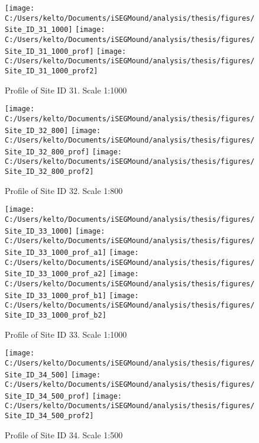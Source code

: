 \documentclass[
  12pt,
]{article}
\begin{document}
\begin{figure}
\texttt{[image: C:/Users/kelto/Documents/iSEGMound/analysis/thesis/figures/Site\_ID\_31\_1000]} \texttt{[image: C:/Users/kelto/Documents/iSEGMound/analysis/thesis/figures/Site\_ID\_31\_1000\_prof]} \texttt{[image: C:/Users/kelto/Documents/iSEGMound/analysis/thesis/figures/Site\_ID\_31\_1000\_prof2]} \caption{Profile of Site ID 31. Scale 1:1000}\label{fig:FigureAOI2-31}
\end{figure}

\begin{figure}
\texttt{[image: C:/Users/kelto/Documents/iSEGMound/analysis/thesis/figures/Site\_ID\_32\_800]} \texttt{[image: C:/Users/kelto/Documents/iSEGMound/analysis/thesis/figures/Site\_ID\_32\_800\_prof]} \texttt{[image: C:/Users/kelto/Documents/iSEGMound/analysis/thesis/figures/Site\_ID\_32\_800\_prof2]} \caption{Profile of Site ID 32. Scale 1:800}\label{fig:FigureAOI2-32}
\end{figure}

\begin{figure}
\texttt{[image: C:/Users/kelto/Documents/iSEGMound/analysis/thesis/figures/Site\_ID\_33\_1000]} \texttt{[image: C:/Users/kelto/Documents/iSEGMound/analysis/thesis/figures/Site\_ID\_33\_1000\_prof\_a1]} \texttt{[image: C:/Users/kelto/Documents/iSEGMound/analysis/thesis/figures/Site\_ID\_33\_1000\_prof\_a2]} \texttt{[image: C:/Users/kelto/Documents/iSEGMound/analysis/thesis/figures/Site\_ID\_33\_1000\_prof\_b1]} \texttt{[image: C:/Users/kelto/Documents/iSEGMound/analysis/thesis/figures/Site\_ID\_33\_1000\_prof\_b2]} \caption{Profile of Site ID 33. Scale 1:1000}\label{fig:FigureAOI2-33}
\end{figure}

\begin{figure}
\texttt{[image: C:/Users/kelto/Documents/iSEGMound/analysis/thesis/figures/Site\_ID\_34\_500]} \texttt{[image: C:/Users/kelto/Documents/iSEGMound/analysis/thesis/figures/Site\_ID\_34\_500\_prof]} \texttt{[image: C:/Users/kelto/Documents/iSEGMound/analysis/thesis/figures/Site\_ID\_34\_500\_prof2]} \caption{Profile of Site ID 34. Scale 1:500}\label{fig:FigureAOI2-34}
\end{figure}
\end{document}
